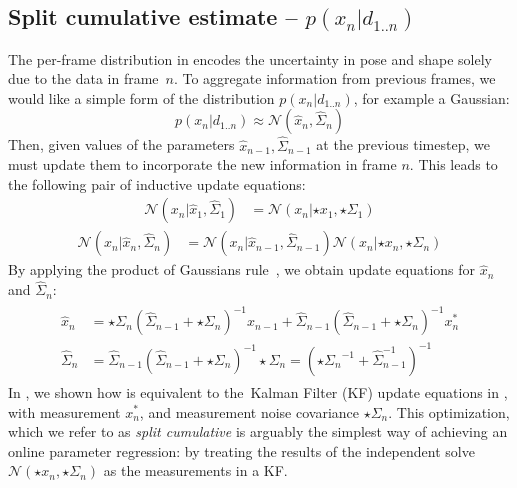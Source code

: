 \subsection{Split cumulative estimate -- $p(x_n|d_{1..n})$}
\label{sec:split}
The per-frame distribution in  encodes the uncertainty in pose and shape solely due to the data in frame~$n$.  To aggregate information from previous frames, we would like a simple form of the distribution $p(x_n|d_{1..n}) $, for example a Gaussian:
\begin{equation}
p(x_n|d_{1..n}) \approx \mathcal{N}(\hat{x}_n, \hat{\Sigma}_n)
\end{equation}
Then, given values of the parameters $\hat{x}_{n-1}, \hat{\Sigma}_{n-1}$ at the previous timestep, we must update them to incorporate the new information in frame $n$.   
%
This leads to the following pair of inductive update equations:
\begin{align}
\mathcal{N}(x_n|\hat{x}_1, \hat{\Sigma}_1) &= \mathcal{N}(x_n|\star{x}_1, \star{\Sigma}_1) 
\end{align}
% 
\begin{align}
\mathcal{N}(x_n | \hat{x}_n, \hat{\Sigma}_n) &= \mathcal{N}(x_n | \hat{x}_{n-1}, \hat{\Sigma}_{n-1}) \mathcal{N}(x_n |\star{x}_n, \star{\Sigma}_n)
\end{align}
By applying the product of Gaussians rule~\cite{petersen2008matrix}, we obtain update equations for $\hat{x}_n$ and $\hat{\Sigma}_n$:
% 
\begin{align}
\begin{split}
\hat{x}_{n} &= \star\Sigma_{n} (\hat{\Sigma}_{n-1} + \star\Sigma_{n})^{-1} \hat{x}_{n-1} + 
\hat{\Sigma}_{n-1} (\hat{\Sigma}_{n-1} + \star\Sigma_n)^{-1} x_n^*
\\
\hat{\Sigma}_n &= \hat{\Sigma}_{n-1} (\hat{\Sigma}_{n-1} + {\star\Sigma_n})^{-1} \star\Sigma_n = \left({\star{\Sigma}_n}^{-1} + \hat{\Sigma}_{n-1}^{-1}\right)^{-1}
\label{eq:combining}
\end{split}
\end{align}
% 
In , we shown how  is equivalent to the~Kalman Filter (KF) update equations in , with measurement $x_n^*$, and measurement noise covariance $\star\Sigma_n$. 
%
This optimization, which we refer to as \emph{split cumulative} is arguably the simplest way of achieving an online parameter regression: by treating the results of the independent solve $\mathcal{N}(\star{x}_n, \star{\Sigma}_n)$ as the measurements in a KF. 

